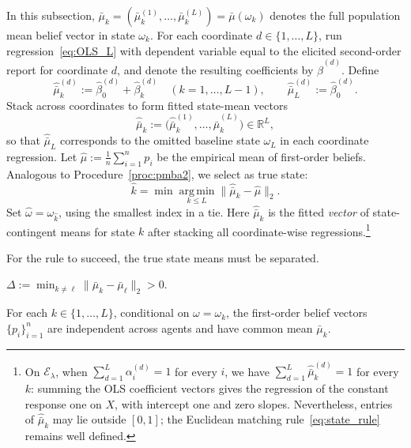 \documentclass[12pt,reqno]{amsart}
\begin{document}
In this subsection,
$\bar\mu_k=(\bar\mu_k^{(1)},\ldots,\bar\mu_k^{(L)})=\bar\mu(\omega_k)$
denotes the full population mean belief vector in state $\omega_k$. For
each coordinate $d\in\{1,\ldots,L\}$, run regression~\eqref{eq:OLS_L} with
dependent variable equal to the elicited second-order report for coordinate $%
d$, and denote the resulting coefficients by $\widehat{\beta}^{(d)}$. Define
\begin{equation*}
\widehat{\bar\mu}^{(d)}_k :=\widehat{\beta}^{(d)}_0+\widehat{\beta}^{(d)}_k
\quad (k=1,\ldots,L-1),\qquad \widehat{\bar\mu}^{(d)}_L:=\widehat{\beta}%
^{(d)}_0.
\end{equation*}
Stack across coordinates to form fitted state-mean vectors
\begin{equation*}
\widehat{\bar\mu}_k:=\big(\widehat{\bar\mu}^{(1)}_k,\ldots,\widehat{\bar\mu}%
^{(L)}_k\big)\in\mathbb{R}^L,
\end{equation*}
so that $\widehat{\bar\mu}_L$ corresponds to the omitted baseline state $%
\omega_L$ in each coordinate regression. Let $\hat\mu:=\tfrac1n%
\sum_{i=1}^{n}p_i$ be the empirical mean of first-order beliefs. Analogous
to Procedure~\ref{proc:pmba2}, we select as true state:
\begin{equation}
\widehat k = \min\operatorname*{arg\,min}_{k\le L} \|\widehat{\bar\mu}%
_k-\hat\mu\|_2.  \label{eq:state_rule}
\end{equation}
Set $\widehat\omega=\omega_{\widehat k}$, using the smallest index in a tie.
Here $\widehat{\bar\mu}_k$ is the fitted \emph{vector} of state-contingent
means for state $k$ after stacking all coordinate-wise regressions.\footnote{%
On $\mathcal{E}_\lambda$, when $\sum_{d=1}^L\alpha_i^{(d)}=1$ for every $i$, we have
$\sum_{d=1}^L\widehat{\bar\mu}_k^{(d)}=1$ for every $k$: summing the OLS
coefficient vectors gives the regression of the constant response one on
$X$, with intercept one and zero slopes. Nevertheless, entries of
$\widehat{\bar\mu}_k$ may lie outside $[0,1]$; the Euclidean matching
rule~\eqref{eq:state_rule} remains well defined.}

For the rule to succeed, the true state means must be separated.

\begin{assumption}\label{ass:linear:sep}
$\displaystyle
  \Delta := \min_{k\neq\ell}\|\bar\mu_k-\bar\mu_\ell\|_2 > 0$.
\end{assumption}

\begin{assumption}\label{ass:linear:fo}
For each $k\in\{1,\ldots,L\}$, conditional on $\omega=\omega_k$, the first-order belief vectors $\{p_i\}_{i=1}^n$ are independent across agents and have common mean $\bar\mu_k$.
\end{assumption}
\end{document}
